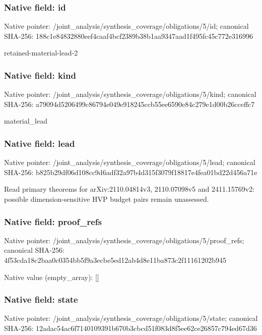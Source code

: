 \documentclass[10pt,a4paper]{article}
\begin{document}
\subsubsection{Native field: id}
Native pointer: /joint\_\allowbreak{}analysis/synthesis\_\allowbreak{}coverage/obligations/5/id; canonical SHA-256: 188c1e84832880eef4caaf4bcf2389b38b1aa9347aad1f495fc45c772e316996

\begingroup\raggedright\sloppy retained-material-lead-2\par\endgroup

\subsubsection{Native field: kind}
Native pointer: /joint\_\allowbreak{}analysis/synthesis\_\allowbreak{}coverage/obligations/5/kind; canonical SHA-256: a79094d5206499c86794e049e918245ccb55ee6590e84c279e1d00b26cceffc7

\begingroup\raggedright\sloppy material\_\allowbreak{}lead\par\endgroup

\subsubsection{Native field: lead}
Native pointer: /joint\_\allowbreak{}analysis/synthesis\_\allowbreak{}coverage/obligations/5/lead; canonical SHA-256: b825b29df06d108cc9d6adf32a97b4d315f3079f18817e4fea01bd22d456a71e

\begingroup\raggedright\sloppy Read primary theorems for arXiv:\allowbreak{}2110.04814v3,\allowbreak{} 2110.07098v5 and 2411.15769v2:\allowbreak{} possible dimension-sensitive HVP budget pairs remain unassessed.\par\endgroup

\subsubsection{Native field: proof\_\allowbreak{}refs}
Native pointer: /joint\_\allowbreak{}analysis/synthesis\_\allowbreak{}coverage/obligations/5/proof\_\allowbreak{}refs; canonical SHA-256: 4f53cda18c2baa0c0354bb5f9a3ecbe5ed12ab4d8e11ba873c2f11161202b945

Native value (empty\_\allowbreak{}array): []

\subsubsection{Native field: state}
Native pointer: /joint\_\allowbreak{}analysis/synthesis\_\allowbreak{}coverage/obligations/5/state; canonical SHA-256: 12adac54ac6f7140109391b670b3cbcd51f083d8f5ee62ce26857c794ed67d36
\end{document}
